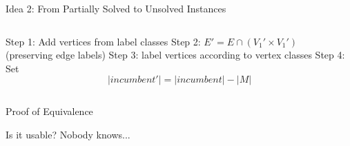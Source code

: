 \documentclass{beamer}
\begin{document}
\begin{frame}{Idea 2: From Partially Solved to Unsolved Instances}
\begin{columns}
    \begin{column}{0.5\textwidth}
      \pause
      \begin{figure}
      \begin{adjustbox}{max totalsize={0.9\textwidth}{0.4\textheight},center}
      \end{adjustbox}
      \end{figure}

      \begin{overprint}
        Step 1: Add vertices from label classes
        Step 2: $E' = E \cap (V_1' \times V_1')$ \\
        (preserving edge labels)
        Step 3: label vertices according to vertex classes
        Step 4: Set \[ |\textit{incumbent}'| = |\textit{incumbent}| - |M| \]
      \end{overprint}
    \end{column}
  \end{columns}
\end{frame}

\begin{frame}{Proof of Equivalence}
\end{frame}

\begin{frame}{Is it usable?}
  Nobody knows...
\end{frame}
\end{document}
